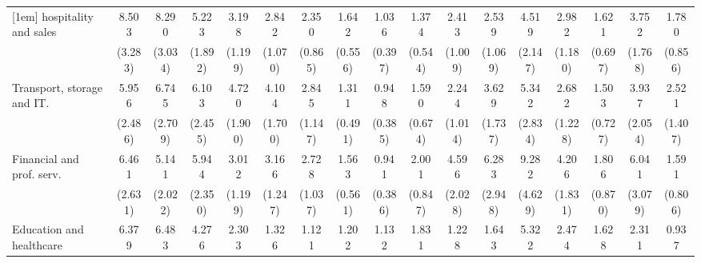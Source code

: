 {\begin{tabular}{l*{16}{c}}
[1em]
hospitality and sales&       8.503\sym{***}&       8.290\sym{***}&       5.223\sym{***}&       3.198\sym{**} &       2.842\sym{**} &       2.350\sym{*}  &       1.642         &       1.036         &       1.374         &       2.413\sym{*}  &       2.539\sym{*}  &       4.519\sym{**} &       2.982\sym{**} &       1.621         &       3.752\sym{**} &       1.780         \\
                    &     (3.283)         &     (3.034)         &     (1.892)         &     (1.199)         &     (1.070)         &     (0.865)         &     (0.556)         &     (0.397)         &     (0.544)         &     (1.009)         &     (1.069)         &     (2.147)         &     (1.180)         &     (0.697)         &     (1.768)         &     (0.856)         \\
[1em]
Transport, storage and IT.&       5.956\sym{***}&       6.745\sym{***}&       6.103\sym{***}&       4.720\sym{***}&       4.104\sym{***}&       2.845\sym{**} &       1.311         &       0.948         &       1.590         &       2.244         &       3.629\sym{**} &       5.342\sym{**} &       2.682\sym{*}  &       1.503         &       3.937\sym{**} &       2.521         \\
                    &     (2.486)         &     (2.709)         &     (2.455)         &     (1.900)         &     (1.700)         &     (1.147)         &     (0.491)         &     (0.385)         &     (0.674)         &     (1.014)         &     (1.737)         &     (2.834)         &     (1.228)         &     (0.727)         &     (2.054)         &     (1.407)         \\
[1em]
Financial and prof. serv.&       6.461\sym{***}&       5.141\sym{***}&       5.944\sym{***}&       3.012\sym{**} &       3.166\sym{**} &       2.728\sym{**} &       1.563         &       0.941         &       2.001         &       4.596\sym{***}&       6.283\sym{***}&       9.282\sym{***}&       4.206\sym{***}&       1.806         &       6.041\sym{***}&       1.591         \\
                    &     (2.631)         &     (2.022)         &     (2.350)         &     (1.199)         &     (1.247)         &     (1.037)         &     (0.561)         &     (0.386)         &     (0.847)         &     (2.028)         &     (2.948)         &     (4.629)         &     (1.831)         &     (0.870)         &     (3.079)         &     (0.806)         \\
[1em]
Education and healthcare&       6.379\sym{***}&       6.483\sym{***}&       4.276\sym{**} &       2.303         &       1.326         &       1.121         &       1.202         &       1.132         &       1.831         &       1.228         &       1.643         &       5.322\sym{**} &       2.474         &       1.628         &       2.311         &       0.937         \\

\end{tabular}}
